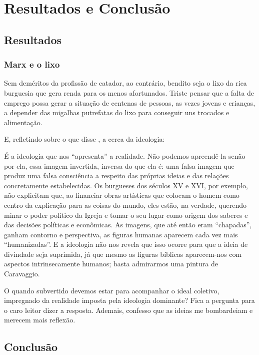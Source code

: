 \chapter{Resultados e Conclusão}

\section{Resultados}


\subsection{Marx e o lixo}

Sem deméritos da profissão de catador, ao contrário, bendito seja o lixo da rica burguesia que gera renda para os menos afortunados. Triste pensar que a falta de emprego possa gerar a situação de centenas de pessoas, as vezes jovens e crianças, a depender das migalhas putrefatas do lixo para conseguir uns trocados e alimentação.

E, refletindo sobre o que disse \cite{Balieiro2014}, a cerca da ideologia:
\begin{citacao}
    É a ideologia que nos “apresenta” a realidade. Não podemos apreendê-la senão
    por ela, essa imagem invertida, inversa do que ela é: uma falsa imagem que produz
    uma falsa consciência a respeito das próprias ideias e das relações concretamente
    estabelecidas. Os burgueses dos séculos XV e XVI, por exemplo, não explicitam
    que, ao financiar obras artísticas que colocam o homem como centro da explicação
    para as coisas do mundo, eles estão, na verdade, querendo minar o poder político
    da Igreja e tomar o seu lugar como origem dos saberes e das decisões políticas
    e econômicas. As imagens, que até então eram “chapadas”, ganham contorno e
    perspectiva, as figuras humanas aparecem cada vez mais “humanizadas”. E a ideologia
    não nos revela que isso ocorre para que a ideia de divindade seja suprimida,
    já que mesmo as figuras bíblicas aparecem-nos com aspectos intrinsecamente humanos;
    basta admirarmos uma pintura de Caravaggio.
\end{citacao}

O quando subvertido devemos estar para acompanhar o ideal coletivo, impregnado da realidade imposta pela ideologia dominante? Fica a pergunta para o caro leitor dizer a resposta. Ademais, confesso que as ideias me bombardeiam e merecem mais reflexão.


\section{Conclusão}
